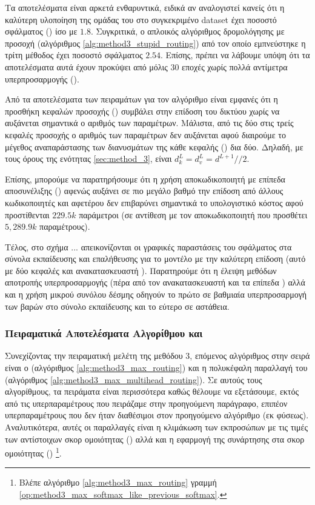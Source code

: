 Τα αποτελέσματα είναι αρκετά ενθαρυντικά, ειδικά αν αναλογιστεί κανείς ότι η καλύτερη υλοποίηση της ομάδας του  στο συγκεκριμένο dataset έχει ποσοστό σφάλματος () ίσο με $1.8$. Συγκριτικά, ο απλοικός αλγόριθμος δρομολόγησης με προσοχή (αλγόριθμος \ref{alg:method3_stupid_routing}) από τον οποίο εμπνεύστηκε η τρίτη μέθοδος έχει ποσοστό σφάλματος $2.54$. Επίσης, πρέπει να λάβουμε υπόψη ότι τα αποτελέσματα αυτά έχουν προκύψει από μόλις 30 εποχές χωρίς πολλά αντίμετρα υπερπροσαρμογής ().\par

Από τα αποτελέσματα των πειραμάτων για τον αλγόριθμο  είναι εμφανές ότι η προσθήκη κεφαλών προσοχής () συμβάλει στην επίδοση του δικτύου χωρίς να αυξάνεται σημαντικά ο αριθμός των παραμέτρων. Μάλιστα, από τις δύο στις τρείς κεφαλές προσοχής ο αριθμός των παραμέτρων δεν αυξάνεται αφού διαιρούμε το μέγεθος αναπαράστασης των διανυσμάτων της κάθε κεφαλής () δια δύο. Δηλαδή, με τους όρους της ενότητας \ref{sec:method_3}, είναι $d_k^L = d_v^L = d^{L+1}//2$.\par

Επίσης, μπορούμε να παρατηρήσουμε ότι η χρήση αποκωδικοποιητή με επίπεδα αποσυνέλιξης () αφενώς αυξάνει σε πιο μεγάλο βαθμό την επίδοση από άλλους κωδικοποιητές και αφετέρου δεν επιβαρύνει σημαντικά το υπολογιστικό κόστος αφού προστίθενται $229.5k$ παράμετροι (σε αντίθεση με τον αποκωδικοποιητή  που προσθέτει $5,289.9k$ παραμέτρους).\par

Τέλος, στο σχήμα ... απεικονίζονται οι γραφικές παραστάσεις του σφάλματος στα σύνολα εκπαίδευσης και επαλήθευσης για το μοντέλο με την καλύτερη επίδοση (αυτό με δύο κεφαλές και ανακατασκευαστή ). Παρατηρούμε ότι η έλειψη μεθόδων αποτροπής υπερπροσαρμογής (πέρα από τον ανακατασκευαστή και τα επίπεδα ) αλλά και η χρήση μικρού συνόλου δέσμης οδηγούν το πρώτο σε βαθμιαία υπερπροσαρμογή των βαρών στο σύνολο εκπαίδευσης και το εύτερο σε αστάθεια.

\subsubsection{Πειραματικά Αποτελέσματα Αλγορίθμου  και }

Συνεχίζοντας την πειραματική μελέτη της μεθόδου 3, επόμενος αλγόριθμος στην σειρά είναι ο  (αλγόριθμος \ref{alg:method3_max_routing}) και η πολυκέφαλη παραλλαγή του (αλγόριθμος \ref{alg:method3_max_multihead_routing}). Σε αυτούς τους αλγορίθμους, τα πειράματα είναι περισσότερα καθώς θέλουμε να εξετάσουμε, εκτός από τις υπερπαραμέτρους που πειράζαμε στην προηγούμενη παράγραφο, επιπέον υπερπαραμέτρους που δεν ήταν διαθέσιμοι στον προηγούμενο αλγόριθμο (εκ φύσεως). Αναλυτικότερα, αυτές οι παραλλαγές είναι η κλιμάκωση των εκπροσώπων με τις τιμές των αντίστοιχων σκορ ομοιότητας () αλλά και η εφαρμογή της συνάρτησης  στα σκορ ομοιότητας () \footnote{Βλέπε αλγόριθμο \ref{alg:method3_max_routing} γραμμή \ref{op:method3_max_softmax_like_previous_softmax}.}.\par


